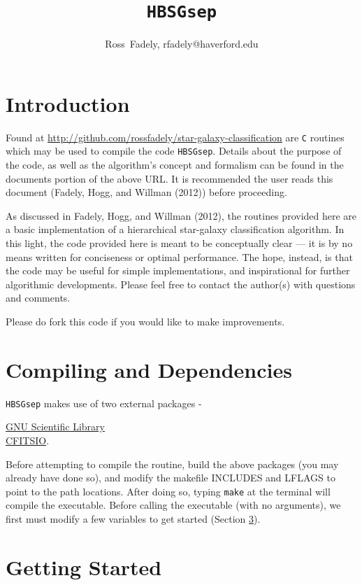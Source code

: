 \documentclass[12pt,preprint]{aastex}
\newcommand{\tab}{\hspace*{2em}}
\begin{document}
\title{\tt HBSGsep} 

\author{Ross~Fadely, rfadely@haverford.edu}

\section{Introduction}

Found at \href{http://github.com/rossfadely/star-galaxy-classification}
{http://github.com/rossfadely/star-galaxy-classification} are {\tt C} routines 
which may be used to compile the code {\tt HBSGsep}.  Details about the purpose 
of the code, as well as the algorithm's concept and formalism can be found in 
the documents portion of the above URL.  It is recommended the user reads 
this document (Fadely, Hogg, and Willman (2012)) before proceeding.

As discussed in Fadely, Hogg, and Willman (2012), the routines provided here 
are a basic implementation of a hierarchical star-galaxy classification algorithm.  
In this light, the code provided here is meant to be conceptually clear --- it is 
by no means written for conciseness or optimal performance.  The hope, instead, 
is that the code may be useful for simple implementations, and inspirational for 
further algorithmic developments.  Please feel free to contact the author(s) with 
questions and comments.

Please do fork this code if you would like to make improvements.

\section{Compiling and Dependencies}

{\tt HBSGsep} makes use of two external packages - 

\tab\href{http://www.gnu.org/software/gsl/}{GNU Scientific Library} \\
\tab\href{http://heasarc.gsfc.nasa.gov/fitsio/}{CFITSIO}.

Before attempting to compile the routine, build the above packages (you may already 
have done so), and modify the makefile INCLUDES and LFLAGS to point to the path 
locations.  After doing so, typing {\tt make} at the terminal will compile the 
executable.  Before calling the executable (with no arguments), we first must modify 
a few variables to get started (Section \ref{sec:start}).

\section{Getting Started} 
\label{sec:start}
\end{document}
